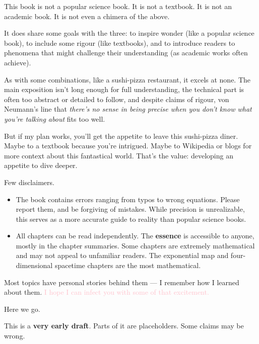 \begin{tcolorbox}[
    colback=white,
    colframe=gray!40,
    boxrule=0.5pt,
    arc=1mm,
    left=10pt,
    right=10pt,
    top=10pt,
    bottom=10pt,
    width=\textwidth,
    enlarge left by=0mm,
    sharp corners=south,
    breakable
]
\setlength{\parskip}{1em}

This book is not a popular science book. It is not a textbook. It is not an academic book. It is not even a chimera of the above.  

It does share some goals with the three: to inspire wonder (like a popular science book), to include some rigour (like textbooks), and to introduce readers to phenomena that might challenge their understanding (as academic works often achieve).

As with some combinations, like a sushi-pizza restaurant, it excels at none.  
The main exposition isn't long enough for full understanding, the technical part is often too abstract or detailed to follow, and despite claims of rigour, von Neumann's line that \textit{there's no sense in being precise when you don't know what you're talking about} fits too well.

But if my plan works, you'll get the appetite to leave this sushi-pizza diner. Maybe to a textbook because you're intrigued. Maybe to Wikipedia or blogs for more context about this fantastical world. That's the value: developing an appetite to dive deeper.

Few disclaimers.

\begin{itemize}
    \item The book contains errors ranging from typos to wrong equations. Please report them, and be forgiving of mistakes. While precision is unrealizable, this serves as a more accurate guide to reality than popular science books.

    \item All chapters can be read independently. The \textbf{essence} is accessible to anyone, mostly in the chapter summaries. Some chapters are extremely mathematical and may not appeal to unfamiliar readers. The exponential map and four-dimensional spacetime chapters are the most mathematical.
\end{itemize}

Most topics have personal stories behind them — I remember how I learned about them. \textcolor{pink}{I hope I can infect you with some of that excitement.}

Here we go.
\end{tcolorbox}


\begin{tcolorbox}[
    colback=red!5,
    colframe=red!60!black,
    boxrule=1pt,
    arc=0.5mm,
    left=10pt,
    right=10pt,
    top=10pt,
    bottom=10pt,
    width=\textwidth,
    sharp corners=south,
    breakable,
    title=\textbf{DRAFT WARNING}
]
\setlength{\parskip}{1em}

This is a \textbf{very early draft}. Parts of it are placeholders. Some claims may be wrong.

\end{tcolorbox}
